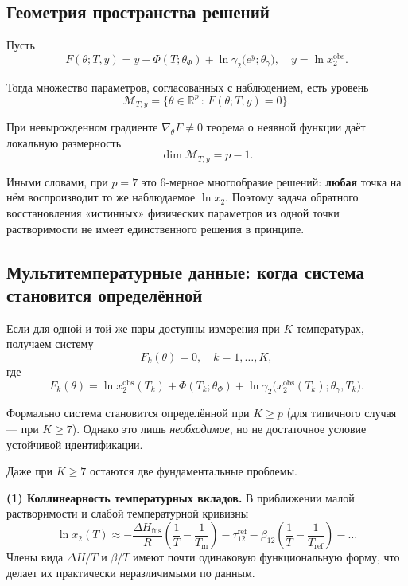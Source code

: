 \documentclass[11pt]{article}
\begin{document}
\subsection{Геометрия пространства решений}

Пусть
\begin{equation*}
F(\theta; T, y) = y + \Phi(T;\theta_{\Phi}) + \ln\gamma_2\bigl(e^y;\theta_{\gamma}\bigr), \quad y=\ln x_2^{\mathrm{obs}}.
\end{equation*}

Тогда множество параметров, согласованных с наблюдением, есть уровень
\begin{equation*}
\mathcal{M}_{T,y} = \{\theta \in \mathbb{R}^p\, :\, F(\theta;T,y)=0\}.
\end{equation*}

При невырожденном градиенте $\nabla_\theta F \neq 0$ теорема о неявной функции даёт локальную размерность
\begin{equation*}
\dim \mathcal{M}_{T,y} = p-1.
\end{equation*}

Иными словами, при $p=7$ это 6-мерное многообразие решений: \textbf{любая} точка на нём воспроизводит то же наблюдаемое $\ln x_2$. Поэтому задача обратного восстановления «истинных» физических параметров из одной точки растворимости не имеет единственного решения в принципе.

\subsection{Мультитемпературные данные: когда система становится определённой}

Если для одной и той же пары доступны измерения при $K$ температурах, получаем систему
\begin{equation*}
F_k(\theta)=0, \quad k=1,\dots,K,
\end{equation*}
где
\begin{equation*}
F_k(\theta)=\ln x_2^{\mathrm{obs}}(T_k)+\Phi(T_k;\theta_{\Phi})+\ln\gamma_2\!\bigl(x_2^{\mathrm{obs}}(T_k);\theta_{\gamma},T_k\bigr).
\end{equation*}

Формально система становится определённой при $K\ge p$ (для типичного случая --- при $K\ge 7$). Однако это лишь \textit{необходимое}, но не достаточное условие устойчивой идентификации.

Даже при $K\ge 7$ остаются две фундаментальные проблемы.

\textbf{(1) Коллинеарность температурных вкладов.}
В приближении малой растворимости и слабой температурной кривизны
\begin{equation*}
\ln x_2(T) \approx -\frac{\Delta H_{\mathrm{fus}}}{R}\!\left(\frac{1}{T}-\frac{1}{T_{\mathrm{m}}}\right)
-\tau_{12}^{\mathrm{ref}}-\beta_{12}\!\left(\frac{1}{T}-\frac{1}{T_{\mathrm{ref}}}\right)-\ldots
\end{equation*}
Члены вида $\Delta H/T$ и $\beta/T$ имеют почти одинаковую функциональную форму, что делает их практически неразличимыми по данным.
\end{document}
